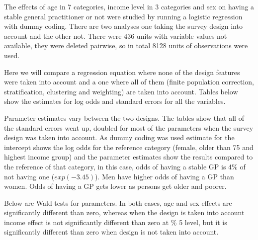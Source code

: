 The effects of age in 7 categories, income level in 3 categories and sex on having a stable general practitioner or not were studied by running a logistic regression with dummy coding. There are two analyses one taking the survey design into account and the other not. There were 436 units with variable values not available, they were deleted pairwise, so in total 8128 units of observations were used.

Here we will compare a regression equation where none of the design features were taken into account and a one where all of them (finite population correction, stratification, clustering and weighting) are taken into account. Tables below show the estimates for log odds and standard errors for all the variables.





Parameter estimates vary between the two designs. The tables show that all of the standard errors went up, doubled for most of the parameters when the survey design was taken into account. As dummy coding was used estimate for the intercept shows the log odds for the reference category (female, older than 75 and highest income group) and the parameter estimates show the results compared to the reference of that category, in this case, odds of having a stable GP is 4\% of not having one ($exp(-3.45)$). Men have higher odds of having a GP than women. Odds of having a GP gets lower as persons get older and poorer.

Below are Wald tests for parameters. In both cases, age and sex effects are significantly different than zero, whereas when the design is taken into account income effect is not significantly different than zero at \% 5 level, but it is significantly different than zero when design is not taken into account. 




